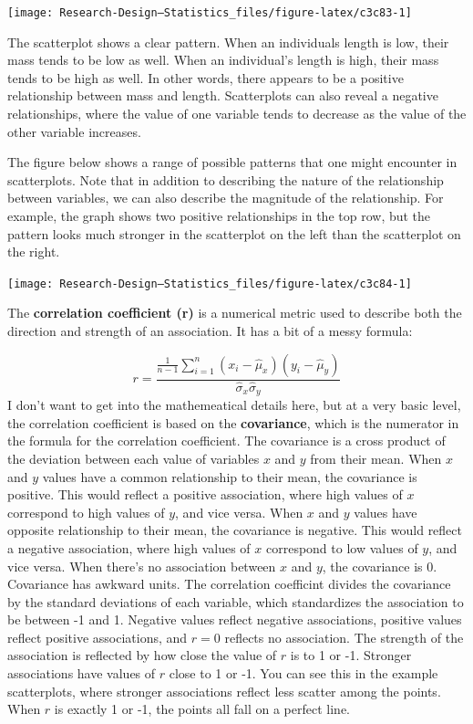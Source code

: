 \documentclass[
]{book}
\begin{document}
\begin{center}\texttt{[image: Research-Design---Statistics\_files/figure-latex/c3c83-1]} \end{center}

The scatterplot shows a clear pattern. When an individuals length is low, their mass tends to be low as well. When an individual's length is high, their mass tends to be high as well. In other words, there appears to be a positive relationship between mass and length. Scatterplots can also reveal a negative relationships, where the value of one variable tends to decrease as the value of the other variable increases.

The figure below shows a range of possible patterns that one might encounter in scatterplots. Note that in addition to describing the nature of the relationship between variables, we can also describe the magnitude of the relationship. For example, the graph shows two positive relationships in the top row, but the pattern looks much stronger in the scatterplot on the left than the scatterplot on the right.

\begin{center}\texttt{[image: Research-Design---Statistics\_files/figure-latex/c3c84-1]} \end{center}

The \textbf{correlation coefficient (r)} is a numerical metric used to describe both the direction and strength of an association. It has a bit of a messy formula:

\[
r = \frac{\frac{1}{n-1} \sum_{i=1}^n (x_i - \hat{\mu}_x)(y_i - \hat{\mu}_y)}{\hat{\sigma}_x \hat{\sigma}_y}
\]
I don't want to get into the mathemeatical details here, but at a very basic level, the correlation coefficient is based on the \textbf{covariance}, which is the numerator in the formula for the correlation coefficient. The covariance is a cross product of the deviation between each value of variables \(x\) and \(y\) from their mean. When \(x\) and \(y\) values have a common relationship to their mean, the covariance is positive. This would reflect a positive association, where high values of \(x\) correspond to high values of \(y\), and vice versa. When \(x\) and \(y\) values have opposite relationship to their mean, the covariance is negative. This would reflect a negative association, where high values of \(x\) correspond to low values of \(y\), and vice versa. When there's no association between \(x\) and \(y\), the covariance is 0. Covariance has awkward units. The correlation coefficint divides the covariance by the standard deviations of each variable, which standardizes the association to be between -1 and 1. Negative values reflect negative associations, positive values reflect positive associations, and \(r=0\) reflects no association. The strength of the association is reflected by how close the value of \(r\) is to 1 or -1. Stronger associations have values of \(r\) close to 1 or -1. You can see this in the example scatterplots, where stronger associations reflect less scatter among the points. When \(r\) is exactly 1 or -1, the points all fall on a perfect line.
\end{document}
